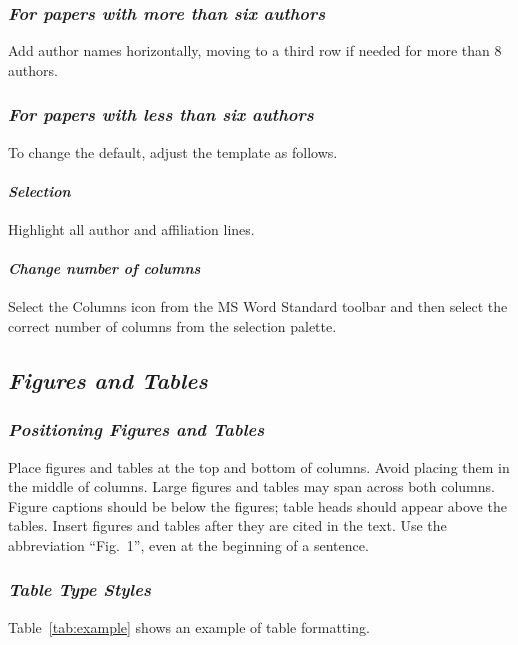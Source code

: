 \documentclass[10pt,conference,a4paper]{IEEEtran}
\let\oldsubsection\subsection
\let\oldsubsubsection\subsubsection
\let\oldparagraph\paragraph
\renewcommand{\subsection}[1]{%
    \oldsubsection{\textit{#1}}%
    \vspace{-3pt} %
}
\renewcommand{\subsubsection}[1]{%
    \oldsubsubsection{\textit{#1}}%
}
\renewcommand{\paragraph}[1]{%
    \oldparagraph{\textit{#1}}%
}
\begin{document}
\subsubsection{For papers with more than six authors}

Add author names horizontally, moving to a third row if needed for more than 8 authors.

\subsubsection{For papers with less than six authors}

To change the default, adjust the template as follows.

\paragraph{Selection}

Highlight all author and affiliation lines.

\paragraph{Change number of columns}

Select the Columns icon from the MS Word Standard toolbar and then select the correct number of columns from the selection palette.

\subsection{Figures and Tables}

\subsubsection{Positioning Figures and Tables}

Place figures and tables at the top and bottom of columns. Avoid placing them in the middle of columns. Large figures and tables may span across both columns. Figure captions should be below the figures; table heads should appear above the tables. Insert figures and tables after they are cited in the text. Use the abbreviation ``Fig.~1'', even at the beginning of a sentence.

\subsubsection{Table Type Styles}

Table~\ref{tab:example} shows an example of table formatting.
\end{document}
